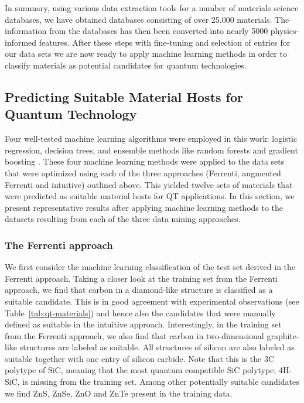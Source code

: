\documentclass[superscriptaddress,unsortedaddress,
 amsmath,amssymb,
 aps,
]{revtex4-2}
\begin{document}
In summary, using various
data extraction tools for a number of materials science databases, we have obtained databases consisting of over 25.000 materials. The information from the databases has then been converted into nearly 5000 physics-informed features.
After these steps with fine-tuning and selection of entries  for our data sets we are now ready to apply machine learning methods in order to classify materials as potential candidates for quantum technologies.

\subsection*{Predicting Suitable Material Hosts for Quantum Technology}
Four well-tested machine learning algorithms were employed in this work: logistic regression, decision trees, and ensemble methods like random forests and gradient boosting \cite{Mehta2019,Hastie2009}. 
These four machine learning methods were applied to the data sets that were optimized using each of the three approaches (Ferrenti, augmented Ferrenti and intuitive) outlined above. This yielded twelve sets of materials that were predicted as suitable material hosts for QT applications. In this section, we present representative results after applying machine learning methods to the datasets resulting from each of the three data mining approaches. 

\subsubsection*{The Ferrenti approach}
We first consider the machine learning classification of the test set derived in the Ferrenti approach. 
Taking a closer look at the training set from the Ferrenti approach, we find that carbon in a diamond-like structure is classified as a suitable candidate. 
This is in good agreement with experimental observations (see Table~\ref{tab:qt-materials}) and hence also the candidates that were manually defined as suitable in the intuitive approach.  
Interestingly, in the training set from the Ferrenti approach, we also find that carbon in two-dimensional graphite-like structures are labeled as suitable. 
All structures of silicon are also labeled as suitable together with one entry of silicon carbide. Note that this is the 3C polytype of SiC, meaning that the most quantum compatible SiC polytype, 4H-SiC, is missing from the training set. Among other potentially suitable candidates we find ZnS, ZnSe, ZnO and ZnTe present in the training data. 
\end{document}
